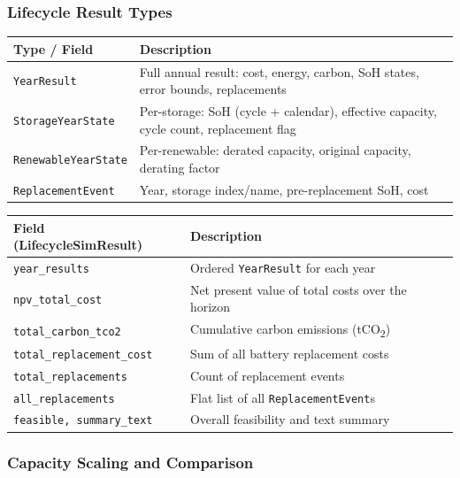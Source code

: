 \subsubsection{Lifecycle Result Types}

\begin{center}
\begin{tabular}{ll}
\hline\hline
\textbf{Type / Field} & \textbf{Description} \\
\hline
\texttt{YearResult} & Full annual result: cost, energy, carbon, SoH states, error bounds, replacements \\
\texttt{StorageYearState} & Per-storage: SoH (cycle + calendar), effective capacity, cycle count, replacement flag \\
\texttt{RenewableYearState} & Per-renewable: derated capacity, original capacity, derating factor \\
\texttt{ReplacementEvent} & Year, storage index/name, pre-replacement SoH, cost \\
\hline\hline
\end{tabular}
\end{center}

\begin{center}
\begin{tabular}{ll}
\hline\hline
\textbf{Field (LifecycleSimResult)} & \textbf{Description} \\
\hline
\texttt{year\_results} & Ordered \texttt{YearResult} for each year \\
\texttt{npv\_total\_cost} & Net present value of total costs over the horizon \\
\texttt{total\_carbon\_tco2} & Cumulative carbon emissions (tCO\textsubscript{2}) \\
\texttt{total\_replacement\_cost} & Sum of all battery replacement costs \\
\texttt{total\_replacements} & Count of replacement events \\
\texttt{all\_replacements} & Flat list of all \texttt{ReplacementEvent}s \\
\texttt{feasible, summary\_text} & Overall feasibility and text summary \\
\hline\hline
\end{tabular}
\end{center}

\subsubsection{Capacity Scaling and Comparison}


